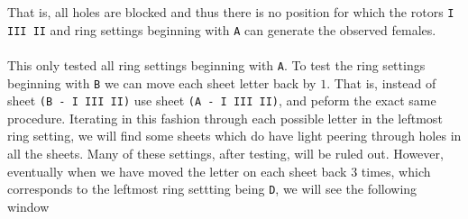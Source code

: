 \noindent That is, all holes are blocked and thus there is no position for which the rotors \texttt{I III II} and ring settings beginning with \texttt{A} can generate the observed females.
\\\\This only tested all ring settings beginning with \texttt{A}. To test the ring settings beginning with \texttt{B} we can move each sheet letter back by $1$. That is, instead of sheet \texttt{(B - I III II)} use sheet \texttt{(A - I III II)}, and peform the exact same procedure. Iterating in this fashion through each possible letter in the leftmost ring setting, we will find some sheets which do have light peering through holes in all the sheets. Many of these settings, after testing, will be ruled out. However, eventually when we have moved the letter on each sheet back $3$ times, which corresponds to the leftmost ring settting being \texttt{D}, we will see the following window
